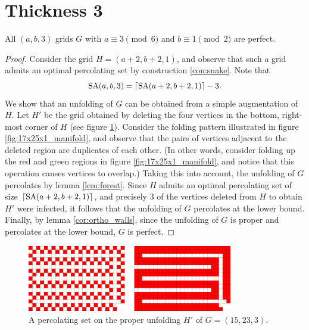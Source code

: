 \section{Thickness 3}

\begin{con}
All $(a,b,3)$ grids $G$ with $a \equiv 3 \pmod 6$ and $b \equiv 1 \pmod 2$ are perfect. 
\end{con}

\begin{proof}
Consider the grid $H=(a+2,b+2,1)$, and observe that such a grid admits an optimal percolating set by construction \ref{con:snake}. Note that
$$\text{SA}(a,b,3) = \lceil\text{SA}(a+2,b+2,1)\rceil - 3.$$
We show that an unfolding of $G$ can be obtained from a simple augmentation of $H$. Let $H'$ be the grid obtained by deleting the four vertices in the bottom, right-most corner of $H$ (see figure \ref{fig:17x25x1_unfolded}). Consider the folding pattern illustrated in figure \ref{fig:17x25x1_manifold}, and observe that the pairs of vertices adjacent to the deleted region are duplicates of each other. (In other words, consider folding up the red and green regions in figure \ref{fig:17x25x1_manifold}, and notice that this operation causes vertices to overlap.) Taking this into account, the unfolding of $G$ percolates by lemma \ref{lem:forest}. Since $H$ admits an optimal percolating set of size $\lceil\text{SA}(a+2,b+2,1)\rceil$, and precisely 3 of the vertices deleted from $H$ to obtain $H'$ were infected, it follows that the unfolding of $G$ percolates at the lower bound. Finally, by lemma \ref{cor:ortho_walls}, since the unfolding of $G$ is proper and percolates at the lower bound, $G$ is perfect.
\end{proof}

\begin{figure}[]
\centering
\includegraphics[width=0.8\textwidth]{figures/7/17x25x1_unfolded.pdf}
\caption{A percolating set on the proper unfolding $H'$ of $G= (15,23,3)$.}
\label{fig:17x25x1_unfolded}
\end{figure}

